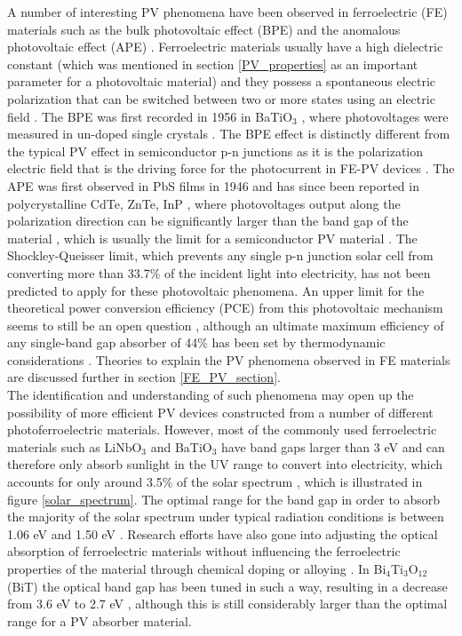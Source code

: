 A number of interesting PV phenomena have been observed in ferroelectric (FE) materials  such as the bulk photovoltaic effect (BPE) and the anomalous photovoltaic effect (APE) \cite{keith}. Ferroelectric materials usually have a high dielectric constant (which was mentioned in section \ref{PV_properties} as an important parameter for a photovoltaic material) and they possess a spontaneous electric polarization that can be switched between two or more states using an electric field \cite{new_FE_PV_1}.
The BPE was first recorded in 1956 in BaTiO$_3$ \cite{keith_46}, where photovoltages were measured in un-doped single crystals \cite{keith}.
The BPE effect is distinctly different from the typical PV effect in semiconductor
p-n junctions as it is the polarization electric field that is the driving force for the photocurrent in FE-PV devices \cite{FE_PV_rev1}. 
The APE was first observed in PbS films in 1946 \cite{keith_54} and has since been reported in polycrystalline CdTe, ZnTe, InP \cite{keith_55, keith_56, keith_57}, where photovoltages output along the polarization direction can be significantly larger than the band gap of the material \cite{FE_PV_rev1}, which is usually the limit for a semiconductor PV material \cite{keith}. 
The Shockley-Queisser limit, which prevents any single p-n junction solar cell from converting more than 33.7\% of the incident light into electricity, has not been predicted to apply for these photovoltaic phenomena. An upper limit for the theoretical power conversion efficiency (PCE) from this photovoltaic mechanism seems to still be an open question \cite{new_FE_PV}, although an ultimate maximum efficiency of any single-band gap absorber of 44\% has been set by thermodynamic considerations \cite{SQ_1961}. Theories to explain the PV phenomena observed in FE materials are discussed further in section \ref{FE_PV_section}.\\

The identification and understanding of such phenomena may open up the possibility of more efficient PV devices constructed from a number of different photoferroelectric materials. However, most of the commonly used ferroelectric materials such as LiNbO$_3$ and BaTiO$_3$ have band gaps larger than 3 eV and can therefore only absorb sunlight in the UV range to convert into electricity, which accounts for only around 3.5\% of the solar spectrum \cite{FE_PV_rev1}, which is illustrated in figure \ref{solar_spectrum}. The optimal range for the band gap in order to absorb the majority of the solar spectrum under typical radiation conditions is between 1.06 eV and 1.50 eV \cite{CZTS_book}. Research efforts have also gone into adjusting the optical absorption of ferroelectric materials without influencing the ferroelectric properties of the material through chemical doping or alloying \cite{FE_PV_rev1}. In Bi$_4$Ti$_3$O$_{12}$ (BiT) the optical band gap has been tuned in such a way, resulting in a decrease from 3.6 eV to 2.7 eV \cite{FE_PV_rev1_83}, although this is still considerably larger than the optimal range for a PV absorber material.\\

